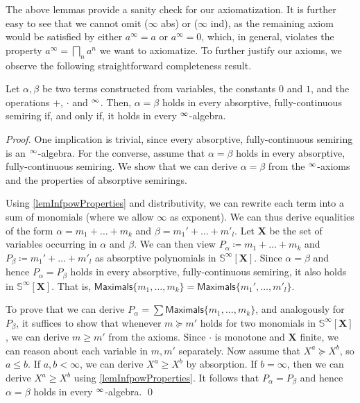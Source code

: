 \documentclass[english,runningheads,a4paper,envcountsame]{llncs}
\newcommand{\Inf}{\bigsqcap}
\newcommand{\Sinf}{{\mathbb S}^{\infty}}
\newcommand*{\XX}{{\bm X}}
\newcommand*{\Max}{\mathsf{Maximals}}
\newcommand*{\absorbs}{\succeq}
\begin{document}
The above lemmas provide a sanity check for our axiomatization.
It is further easy to see that we cannot omit ($\infty$ abs) or ($\infty$ ind), as the remaining axiom would be satisfied by either $a^\infty = a$ or $a^\infty = 0$, which, in general, violates the property $a^\infty = \Inf_n a^n$ we want to axiomatize.
To further justify our axioms, we observe the following straightforward completeness result.

\begin{proposition}
Let $\alpha,\beta$ be two terms constructed from variables, the constants $0$ and $1$, and the operations $+$, $\cdot$ and ${}^\infty$.
Then, $\alpha = \beta$ holds in every absorptive, fully-continuous semiring if, and only if, it holds in every ${}^\infty$-algebra.
\end{proposition}
\begin{proof}
One implication is trivial, since every absorptive, fully-continuous semiring is an ${}^\infty$-algebra.
For the converse, assume that $\alpha = \beta$ holds in every absorptive, fully-continuous semiring.
We show that we can derive $\alpha = \beta$ from the ${}^\infty$-axioms and the properties of absorptive semirings.

Using \cref{lemInfpowProperties} and distributivity, we can rewrite each term into a sum of monomials (where we allow $\infty$ as exponent).
We can thus derive equalities of the form $\alpha = m_1 + \dots + m_k$ and $\beta = m_1' + \dots + m'_l$.
Let $\XX$ be the set of variables occurring in $\alpha$ and $\beta$.
We can then view $P_\alpha \coloneqq m_1 + \dots + m_k$ and $P_\beta \coloneqq m_1' + \dots + m'_l$ as absorptive polynomials in $\Sinf[\XX]$.
Since $\alpha = \beta$ and hence $P_\alpha = P_\beta$ holds in every absorptive, fully-continuous semiring, it also holds in $\Sinf[\XX]$.
That is, $\Max\{m_1,\dots,m_k\} = \Max\{m_1',\dots,m'_l\}$.

To prove that we can derive $P_\alpha = \sum \Max\{m_1,\dots,m_k\}$, and analogously for $P_\beta$, it suffices to show that whenever $m \absorbs m'$ holds for two monomials in $\Sinf[\XX]$, we can derive $m \ge m'$ from the axioms.
Since $\cdot$ is monotone and $\XX$ finite, we can reason about each variable in $m,m'$ separately.
Now assume that $X^a \absorbs X^b$, so $a \le b$.
If $a,b < \infty$, we can derive $X^a \ge X^b$ by absorption.
If $b = \infty$, then we can derive $X^a \ge X^b$ using \cref{lemInfpowProperties}.
It follows that $P_\alpha = P_\beta$  and hence $\alpha = \beta$ holds in every ${}^\infty$-algebra. \qed
\end{proof}
\end{document}
